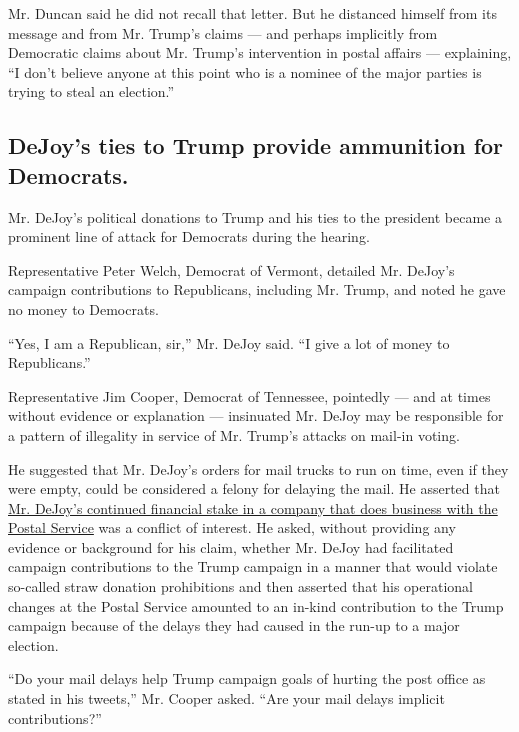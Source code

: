 Mr. Duncan said he did not recall that letter. But he distanced himself
from its message and from Mr. Trump's claims --- and perhaps implicitly
from Democratic claims about Mr. Trump's intervention in postal affairs
--- explaining, ``I don't believe anyone at this point who is a nominee
of the major parties is trying to steal an election.''

\hypertarget{dejoys-ties-to-trump-provide-ammunition-for-democrats}{%
\subsection{DeJoy's ties to Trump provide ammunition for
Democrats.}\label{dejoys-ties-to-trump-provide-ammunition-for-democrats}}

Mr. DeJoy's political donations to Trump and his ties to the president
became a prominent line of attack for Democrats during the hearing.

Representative Peter Welch, Democrat of Vermont, detailed Mr. DeJoy's
campaign contributions to Republicans, including Mr. Trump, and noted he
gave no money to Democrats.

``Yes, I am a Republican, sir,'' Mr. DeJoy said. ``I give a lot of money
to Republicans.''

Representative Jim Cooper, Democrat of Tennessee, pointedly --- and at
times without evidence or explanation --- insinuated Mr. DeJoy may be
responsible for a pattern of illegality in service of Mr. Trump's
attacks on mail-in voting.

He suggested that Mr. DeJoy's orders for mail trucks to run on time,
even if they were empty, could be considered a felony for delaying the
mail. He asserted that
\href{https://slack-redir.net/link?url=https\%3A\%2F\%2Fwww.nytimes3xbfgragh.onion\%2F2020\%2F08\%2F17\%2Fus\%2Fpolitics\%2Fdejoy-postal-service-mail-in-voting.html}{Mr.
DeJoy's continued financial stake in a company that does business with
the Postal Service} was a conflict of interest. He asked, without
providing any evidence or background for his claim, whether Mr. DeJoy
had facilitated campaign contributions to the Trump campaign in a manner
that would violate so-called straw donation prohibitions and then
asserted that his operational changes at the Postal Service amounted to
an in-kind contribution to the Trump campaign because of the delays they
had caused in the run-up to a major election.

``Do your mail delays help Trump campaign goals of hurting the post
office as stated in his tweets,'' Mr. Cooper asked. ``Are your mail
delays implicit contributions?''

